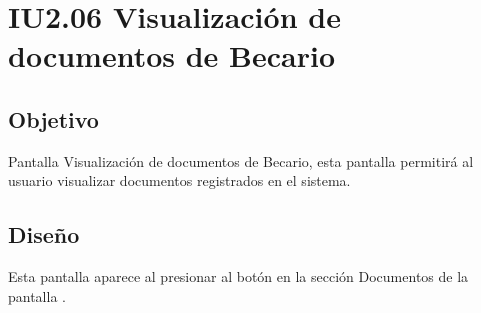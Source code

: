 \newpage
\section{IU2.06 Visualización de documentos de Becario}

\subsection{Objetivo}
	Pantalla Visualización de documentos de Becario, esta pantalla permitirá al usuario visualizar documentos registrados en el sistema.
	


\subsection{Diseño}
	Esta pantalla aparece al presionar al botón  en la sección Documentos de la pantalla .

	
